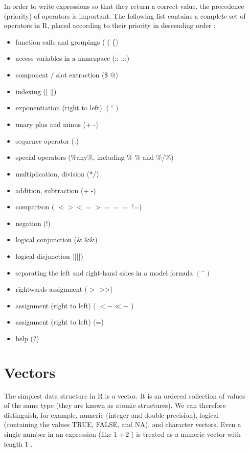 \documentclass[11pt,openany,executivepaper]{book}
\begin{document}
In order to write expressions so that they return a correct value, the precedence (priority) of operators is important. The following list contains a complete set of operators in R, placed according to their priority in descending order \cite{260}:

\begin{itemize}
  \item function calls and groupings ( ( \{)
  \item access variables in a namespace (:: :::)
  \item component / slot extraction (\$ @)
  \item indexing ([ [[)
  \item exponentiation (right to left) $\left({ }^{\wedge}\right)$
  \item unary plus and minus (+ -)
  \item sequence operator (:)
  \item special operators (\%any\%, including \% \% and \%/\%)
  \item multiplication, division (*/)
  \item addition, subtraction (+ -)
  \item comparison ( $<><=>===$ !=)
  \item negation (!)
  \item logical conjunction (\& \&\&)
  \item logical disjunction (|||)
  \item separating the left and right-hand sides in a model formula $\left({ }^{\sim}\right)$
  \item rightwards assignment (-> ->>)
  \item assignment (right to left) ( $<-\ll-$ )
  \item assignment (right to left) (=)
  \item help (?)
\end{itemize}

\section{Vectors}
The simplest data structure in R is a vector. It is an ordered collection of values of the same type (they are known as atomic structures). We can therefore distinguish, for example, numeric (integer and double-precision), logical (containing the values TRUE, FALSE, and NA), and character vectors. Even a single number in an expression (like $1+2$ ) is treated as a numeric vector with length 1 .
\end{document}
